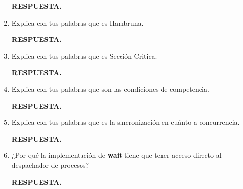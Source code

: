 \documentclass[12pt]{article}
\begin{document}
\begin{enumerate}
    \textbf{RESPUESTA.}

    \item Explica con tus palabras que es Hambruna.
    \vspace{2mm}
    
    \textbf{RESPUESTA.}

    \item Explica con tus palabras que es Sección Critica.
    \vspace{2mm}
    
    \textbf{RESPUESTA.}

    \item Explica con tus palabras que son las condiciones de competencia.
    \vspace{2mm}
    
    \textbf{RESPUESTA.}

    \item Explica con tus palabras que es la sincronización en cuánto a concurrencia.
    \vspace{2mm}
    
    \textbf{RESPUESTA.}

    \item ¿Por qué la implementación de \textbf{wait} tiene que tener acceso directo al despachador de procesos?
    \vspace{2mm}
    
    \textbf{RESPUESTA.}

\end{enumerate}
\end{document}
